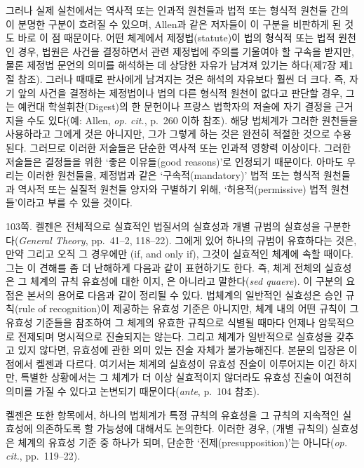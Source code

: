 {그러나 실제 실천에서는 역사적 또는 인과적 원천들과 법적 또는 형식적
원천들 간의 이 분명한 구분이 흐려질 수 있으며, Allen과 같은 저자들이 이
구분을 비판하게 된 것도 바로 이 점 때문이다. 어떤 체계에서
제정법(statute)이 법의 형식적 또는 법적 원천인 경우, 법원은 사건을
결정하면서 관련 제정법에 주의를 기울여야 할 구속을 받지만, 물론 제정법
문언의 의미를 해석하는 데 상당한 자유가 남겨져 있기는 하다(제7장 제1절
참조). 그러나 때때로 판사에게 남겨지는 것은 해석의 자유보다 훨씬 더
크다. 즉, 자기 앞의 사건을 결정하는 제정법이나 법의 다른 형식적 원천이
없다고 판단할 경우, 그는 예컨대 학설휘찬(Digest)의 한 문헌이나 프랑스
법학자의 저술에 자기 결정을 근거지을 수도 있다(예: Allen, \emph{op.
cit.}, p.~260 이하 참조). 해당 법체계가 그러한 원천들을 사용하라고
그에게  것은 아니지만, 그가 그렇게 하는 것은
완전히 적절한 것으로 수용된다. 그러므로 이러한 저술들은 단순한 역사적
또는 인과적 영향력 이상이다. 그러한 저술들은 결정들을 위한 ‘좋은
이유들(good reasons)’로 인정되기 때문이다. 아마도 우리는 이러한
원천들을, 제정법과 같은 ‘구속적(mandatory)’ 법적 또는 형식적 원천들과
역사적 또는 실질적 원천들 양자와 구별하기 위해, ‘허용적(permissive) 법적
원천들’이라고 부를 수 있을 것이다.

\noteentry 103쪽.  켈젠은
전체적으로 실효적인 법질서의 실효성과 개별 규범의 실효성을
구분한다(\emph{General Theory}, pp.~41--2, 118--22). 그에게 있어 하나의
규범이 유효하다는 것은, 만약 그리고 오직 그 경우에만 (if, and only if),
그것이  실효적인 체계에 속할 때이다. 그는
이 견해를 좀 더 난해하게 다음과 같이 표현하기도 한다. 즉, 체계 전체의
실효성은 그 체계의 규칙 유효성에 대한 이지, 은 아니라고
말한다(\emph{sed quaere}). 이 구분의 요점은 본서의 용어로 다음과 같이
정리될 수 있다. 법체계의 일반적인 실효성은 승인 규칙(rule of
recognition)이 제공하는 유효성 기준은 아니지만, 체계 내의 어떤 규칙이 그
유효성 기준들을 참조하여 그 체계의 유효한 규칙으로 식별될 때마다 언제나
암묵적으로 전제되며 명시적으로 진술되지는 않는다. 그리고 체계가
일반적으로 실효성을 갖추고 있지 않다면, 유효성에 관한 의미 있는 진술
자체가 불가능해진다. 본문의 입장은 이 점에서 켈젠과 다르다. 여기서는
체계의 실효성이 유효성 진술이 이루어지는 이긴 하지만, 특별한 상황에서는 그 체계가 더 이상 실효적이지
않더라도 유효성 진술이 여전히 의미를 가질 수 있다고 논변되기
때문이다(\emph{ante}, p.~104 참조).

켈젠은 또한  항목에서, 하나의
법체계가 특정 규칙의 유효성을 그 규칙의 지속적인 실효성에 의존하도록 할
가능성에 대해서도 논의한다. 이러한 경우, (개별 규칙의) 실효성은 체계의
유효성 기준 중 하나가 되며, 단순한 ‘전제(presupposition)’는
아니다(\emph{op. cit.}, pp.~119--22).

}
